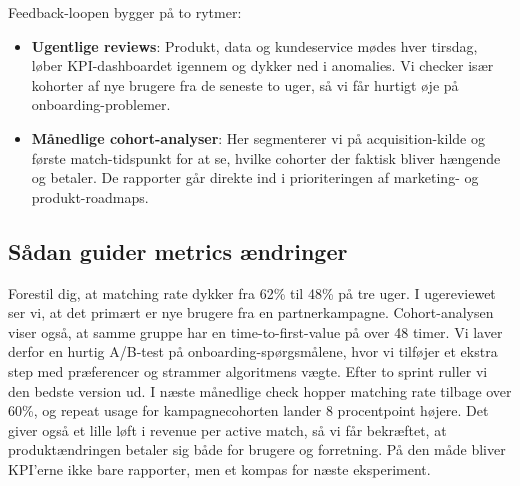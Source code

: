 Feedback-loopen bygger på to rytmer:
\begin{itemize}
    \item \textbf{Ugentlige reviews}: Produkt, data og kundeservice mødes hver tirsdag, løber KPI-dashboardet igennem og dykker ned i anomalies. Vi checker især kohorter af nye brugere fra de seneste to uger, så vi får hurtigt øje på onboarding-problemer.
    \item \textbf{Månedlige cohort-analyser}: Her segmenterer vi på acquisition-kilde og første match-tidspunkt for at se, hvilke cohorter der faktisk bliver hængende og betaler. De rapporter går direkte ind i prioriteringen af marketing- og produkt-roadmaps.
\end{itemize}

\subsection*{Sådan guider metrics ændringer}
Forestil dig, at matching rate dykker fra 62\% til 48\% på tre uger. I ugereviewet ser vi, at det primært er nye brugere fra en partnerkampagne. Cohort-analysen viser også, at samme gruppe har en time-to-first-value på over 48 timer. Vi laver derfor en hurtig A/B-test på onboarding-spørgsmålene, hvor vi tilføjer et ekstra step med præferencer og strammer algoritmens vægte. Efter to sprint ruller vi den bedste version ud. I næste månedlige check hopper matching rate tilbage over 60\%, og repeat usage for kampagnecohorten lander 8 procentpoint højere. Det giver også et lille løft i revenue per active match, så vi får bekræftet, at produktændringen betaler sig både for brugere og forretning. På den måde bliver KPI'erne ikke bare rapporter, men et kompas for næste eksperiment.
